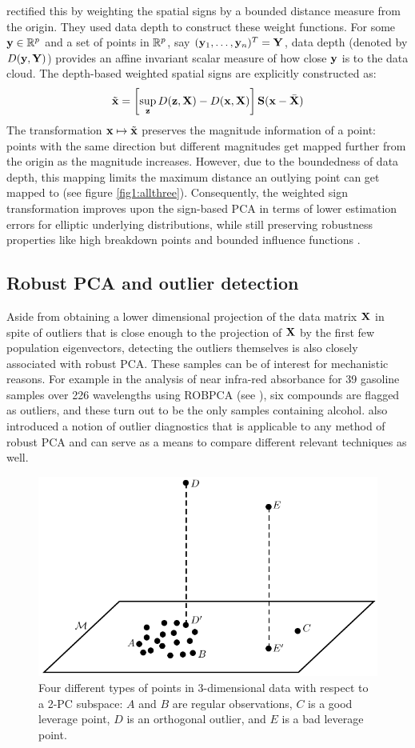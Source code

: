 \cite{Majumdar15} rectified this by weighting the spatial signs by a bounded distance measure from the origin. They used data depth \citep{zuo00} to construct these weight functions. For some ${\bf{y}} \in {\mathbb{R}}^p$ and a set of points in ${\mathbb{R}}^p$, say $({\bf{y}}_1, \ldots, {\bf{y}}_n)^T = {\mathbf{Y}}$, data depth (denoted by $D({\bf{y}}, {\mathbf{Y}})$) provides an affine invariant scalar measure of how close ${\bf{y}}$ is to the data cloud. The depth-based weighted spatial signs \citep{Majumdar15} are explicitly constructed as:
%
\begin{align}
\tilde {{\bf{x}}} = \left[ \sup_{{\bf{z}}} D({\bf{z}}, {\mathbf{X}}) - D({\bf{x}}, {\mathbf{X}}) \right] {\mathbf{S}}( {\bf{x}} - \bar {{\mathbf{X}}} )
\end{align}
%
The transformation ${\bf{x}} \mapsto \tilde {{\bf{x}}}$ preserves the magnitude information of a point: points with the same direction but different magnitudes get mapped further from the origin as the magnitude increases. However, due to the boundedness of data depth, this mapping limits the maximum distance an outlying point can get mapped to (see figure \ref{fig1:allthree}). Consequently, the weighted sign transformation improves upon the sign-based PCA in terms of lower estimation errors for elliptic underlying distributions, while still preserving robustness properties like high breakdown points and bounded influence functions \citep{Majumdar15}.

\subsection*{\sffamily \large Robust PCA and outlier detection}
Aside from obtaining a lower dimensional projection of the data matrix ${\mathbf{X}}$ in spite of outliers that is close enough to the projection of ${\mathbf{X}}$ by the first few population eigenvectors, detecting the outliers themselves is also closely associated with robust PCA. These samples can be of interest for mechanistic reasons. For example in the analysis of near infra-red absorbance for 39 gasoline samples over 226 wavelengths using ROBPCA (see \cite{hubert05}), six compounds are flagged as outliers, and these turn out to be the only samples containing alcohol. \cite{hubert05} also introduced a notion of outlier diagnostics that is applicable to any method of robust PCA and can serve as a means to compare different relevant techniques as well.

\begin{figure}[t]
\centering
\includegraphics[width=.6\textwidth]{ROBPCA}
	\caption{Four different types of points in 3-dimensional data with respect to a 2-PC subspace: $A$ and $B$ are regular observations, $C$ is a good leverage point, $D$ is an orthogonal outlier, and $E$ is a bad leverage point.}
	\label{fig:figROBPCA}
\end{figure}

